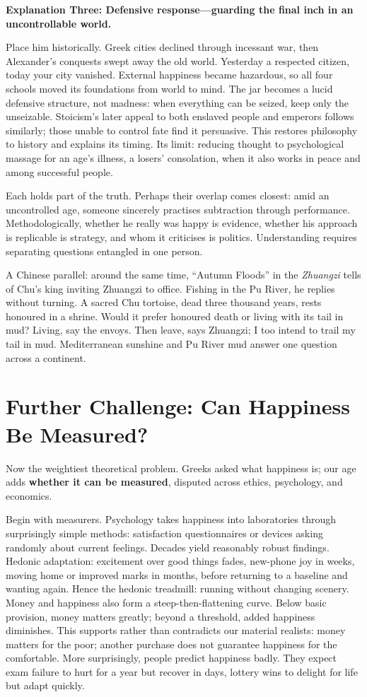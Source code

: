 \textbf{Explanation Three: Defensive response---guarding the final inch in an uncontrollable world.}

Place him historically. Greek cities declined through incessant war, then Alexander's conquests swept away the old world. Yesterday a respected citizen, today your city vanished. External happiness became hazardous, so all four schools moved its foundations from world to mind. The jar becomes a lucid defensive structure, not madness: when everything can be seized, keep only the unseizable. Stoicism's later appeal to both enslaved people and emperors follows similarly; those unable to control fate find it persuasive. This restores philosophy to history and explains its timing. Its limit: reducing thought to psychological massage for an age's illness, a losers' consolation, when it also works in peace and among successful people.

Each holds part of the truth. Perhaps their overlap comes closest: amid an uncontrolled age, someone sincerely practises subtraction through performance. Methodologically, whether he really was happy is evidence, whether his approach is replicable is strategy, and whom it criticises is politics. Understanding requires separating questions entangled in one person.

A Chinese parallel: around the same time, ``Autumn Floods'' in the \textit{Zhuangzi} tells of Chu's king inviting Zhuangzi to office. Fishing in the Pu River, he replies without turning. A sacred Chu tortoise, dead three thousand years, rests honoured in a shrine. Would it prefer honoured death or living with its tail in mud? Living, say the envoys. Then leave, says Zhuangzi; I too intend to trail my tail in mud. Mediterranean sunshine and Pu River mud answer one question across a continent.

\section[Further Challenge: Measuring Happiness]{Further Challenge: Can Happiness Be Measured?}
Now the weightiest theoretical problem. Greeks asked what happiness is; our age adds \textbf{whether it can be measured}, disputed across ethics, psychology, and economics.

Begin with measurers. Psychology takes happiness into laboratories through surprisingly simple methods: satisfaction questionnaires or devices asking randomly about current feelings. Decades yield reasonably robust findings. Hedonic adaptation: excitement over good things fades, new-phone joy in weeks, moving home or improved marks in months, before returning to a baseline and wanting again. Hence the hedonic treadmill: running without changing scenery. Money and happiness also form a steep-then-flattening curve. Below basic provision, money matters greatly; beyond a threshold, added happiness diminishes. This supports rather than contradicts our material realists: money matters for the poor; another purchase does not guarantee happiness for the comfortable. More surprisingly, people predict happiness badly. They expect exam failure to hurt for a year but recover in days, lottery wins to delight for life but adapt quickly.

